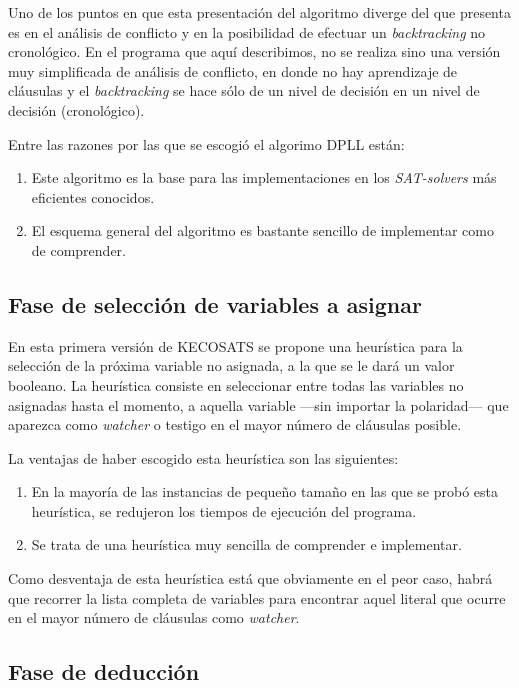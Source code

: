 \documentclass[12pt,lettersize,oneside]{article}
\begin{document}
Uno de los puntos en que esta presentación del algoritmo diverge del que
presenta \cite{Zhang} es en el análisis de conflicto y en la posibilidad de
efectuar un \emph{backtracking} no cronológico. En el programa que aquí
describimos, no se realiza sino una versión muy simplificada de análisis de
conflicto, en donde no hay aprendizaje de cláusulas y el \emph{backtracking} se
hace sólo de un nivel de decisión en un nivel de decisión (cronológico).

Entre las razones por las que se escogió el algorimo DPLL están:
\begin{enumerate}
\item Este algoritmo es la base para las implementaciones en los
  \emph{SAT-solvers} más eficientes conocidos.
\item El esquema general del algoritmo es bastante sencillo de implementar como
  de comprender.
\end{enumerate}
\subsection{Fase de selección de variables a asignar}

En esta primera versión de KECOSATS se propone una heurística para la selección
de la próxima variable no asignada, a la que se le dará un valor booleano. La
heurística consiste en seleccionar entre todas las variables no asignadas hasta
el momento, a aquella variable ---sin importar la polaridad--- que aparezca como
\emph{watcher} o testigo en el mayor número de cláusulas posible.

La ventajas de haber escogido esta heurística son las siguientes:
\begin{enumerate}
\item En la mayoría de las instancias de pequeño tamaño en las que se probó esta
  heurística, se redujeron los tiempos de ejecución del programa.
\item Se trata de una heurística muy sencilla de comprender e implementar.
\end{enumerate}

Como desventaja de esta heurística está que obviamente en el peor caso, habrá
que recorrer la lista completa de variables para encontrar aquel literal que
ocurre en el mayor número de cláusulas como \emph{watcher}.

\subsection{Fase de deducción}
\end{document}
